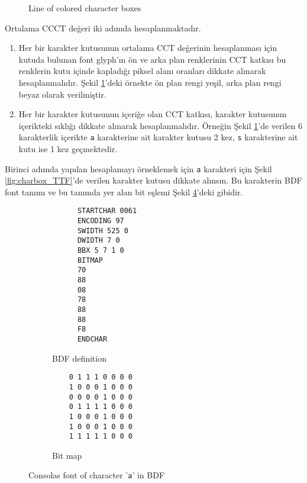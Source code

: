 \documentclass{article}
\begin{document}
\begin{figure}[H]
  \centering
  
  \caption{Line of colored character boxes}
  \label{fig:line_of_charboxes}
\end{figure}

Ortalama CCCT değeri iki adımda hesaplanmaktadır.

\begin{enumerate}
  \item Her bir karakter kutusunun ortalama CCT değerinin hesaplanması için kutuda bulunan font glyph'ın ön ve arka plan
    renklerinin CCT katkısı bu renklerin kutu içinde kapladığı piksel alanı oranları dikkate alınarak hesaplanmalıdır.
    Şekil \ref{fig:line_of_charboxes}'deki örnekte ön plan rengi yeşil, arka plan rengi beyaz olarak verilmiştir.

  \item Her bir karakter kutusunun içeriğe olan CCT katkısı, karakter kutusunun içerikteki sıklığı dikkate alınarak
    hesaplanmalıdır.  Örneğin Şekil \ref{fig:line_of_charboxes}'de verilen 6 karakterlik içerikte \texttt{a} karakterine
    ait karakter kutusu 2 kez, \texttt{s} karakterine ait kutu ise 1 kez geçmektedir.
\end{enumerate}

Birinci adımda yapılan hesaplamayı örneklemek için \texttt{a} karakteri için Şekil \ref{fig:charbox_TTF}'de verilen
karakter kutusu dikkate alınsın.  Bu karakterin BDF font tanımı ve bu tanımda yer alan bit eşlemi Şekil
\ref{fig:letter_a_BDF}'deki gibidir.

\begin{figure}[htbp]
  \begin{subfigure}{0.48\textwidth}
    \centering
    \begin{BVerbatim}
      STARTCHAR 0061
      ENCODING 97
      SWIDTH 525 0
      DWIDTH 7 0
      BBX 5 7 1 0
      BITMAP
      70
      88
      08
      78
      88
      88
      F8
      ENDCHAR
    \end{BVerbatim}
    \caption{BDF definition}
    \label{code:letter_a_BDF_definitiion}
  \end{subfigure}
  \begin{subfigure}{0.48\textwidth}
    \centering
    \begin{BVerbatim}
    0 1 1 1 0 0 0 0
    1 0 0 0 1 0 0 0
    0 0 0 0 1 0 0 0
    0 1 1 1 1 0 0 0
    1 0 0 0 1 0 0 0
    1 0 0 0 1 0 0 0
    1 1 1 1 1 0 0 0
    \end{BVerbatim}
    \caption{Bit map}
    \label{fig:letter_a_BDF_bitmap}
  \end{subfigure}

  \caption{Consolas font of character '\texttt{a}' in BDF}
  \label{fig:letter_a_BDF}
\end{figure}
\end{document}
